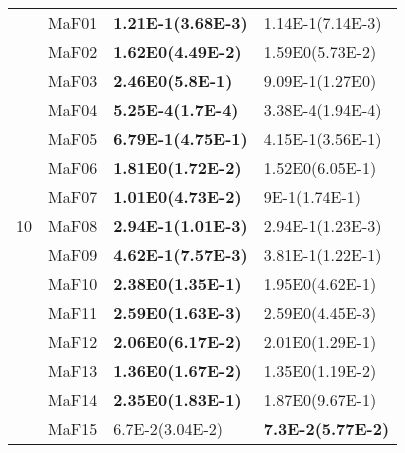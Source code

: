 \documentclass[]{article}
\begin{document}
\begin{table}
\begin{footnotesize}
\begin{tabular}{|l|l|l|l|}
\multirow{15}{*}{10} & MaF01 & \cellcolor{gray95} {\bf 1.21E-1(3.68E-3)} & 1.14E-1(7.14E-3)\\
 & MaF02 & \cellcolor{gray95} {\bf 1.62E0(4.49E-2)} & \cellcolor{gray95} 1.59E0(5.73E-2)\\
 & MaF03 & \cellcolor{gray95} {\bf 2.46E0(5.8E-1)} & 9.09E-1(1.27E0)\\
 & MaF04 & \cellcolor{gray95} {\bf 5.25E-4(1.7E-4)} & 3.38E-4(1.94E-4)\\
 & MaF05 & \cellcolor{gray95} {\bf 6.79E-1(4.75E-1)} & \cellcolor{gray95} 4.15E-1(3.56E-1)\\
 & MaF06 & \cellcolor{gray95} {\bf 1.81E0(1.72E-2)} & 1.52E0(6.05E-1)\\
 & MaF07 & \cellcolor{gray95} {\bf 1.01E0(4.73E-2)} & 9E-1(1.74E-1)\\
 & MaF08 & \cellcolor{gray95} {\bf 2.94E-1(1.01E-3)} & \cellcolor{gray95} 2.94E-1(1.23E-3)\\
 & MaF09 & \cellcolor{gray95} {\bf 4.62E-1(7.57E-3)} & 3.81E-1(1.22E-1)\\
 & MaF10 & \cellcolor{gray95} {\bf 2.38E0(1.35E-1)} & 1.95E0(4.62E-1)\\
 & MaF11 & \cellcolor{gray95} {\bf 2.59E0(1.63E-3)} & \cellcolor{gray95} 2.59E0(4.45E-3)\\
 & MaF12 & \cellcolor{gray95} {\bf 2.06E0(6.17E-2)} & \cellcolor{gray95} 2.01E0(1.29E-1)\\
 & MaF13 & \cellcolor{gray95} {\bf 1.36E0(1.67E-2)} & \cellcolor{gray95} 1.35E0(1.19E-2)\\
 & MaF14 & \cellcolor{gray95} {\bf 2.35E0(1.83E-1)} & \cellcolor{gray95} 1.87E0(9.67E-1)\\
 & MaF15 & \cellcolor{gray95} 6.7E-2(3.04E-2) & \cellcolor{gray95} {\bf 7.3E-2(5.77E-2)}\\
\hline


\end{tabular}
\end{footnotesize}
\end{table}
\end{document}
